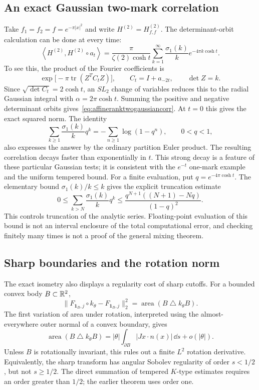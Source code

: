 \subsection{An exact Gaussian two-mark correlation}
\label{subsec:affineranktwogaussian}

Take $f_1=f_2=f=e^{-\pi|x|^2}$ and write $H^{(2)}=H_{f,f}^{(2)}$.
The determinant-orbit calculation can be done at every time:
\begin{equation}
 \boxed{
 \left\langle H^{(2)},H^{(2)}\circ a_t\right\rangle
 =\frac{\pi}{\zeta(2)\cosh t}
       \sum_{k=1}^\infty\frac{\sigma_1(k)}k
                         e^{-4\pi k\cosh t}.
 }
 \label{eq:affineranktwogaussiancorr}
\end{equation}
To see this, the product of the Fourier coefficients is
\[
 \exp\bigl[-\pi\operatorname{tr}(Z^TC_tZ)\bigr],
 \qquad C_t=I+a_{-2t},\qquad \det Z=k.
\]
Since $\sqrt{\det C_t}=2\cosh t$, an $SL_2$ change of variables
reduces this to the radial Gaussian integral with
$\alpha=2\pi\cosh t$. Summing the positive and negative determinant
orbits gives~\eqref{eq:affineranktwogaussiancorr}. At $t=0$ this gives
the exact squared norm. The identity
\[
 \sum_{k\geq1}\frac{\sigma_1(k)}k q^k
 =-\sum_{n\geq1}\log(1-q^n),\qquad 0<q<1,
\]
also expresses the answer by the ordinary partition Euler product.
The resulting correlation decays faster than exponentially in $t$.
This strong decay is a feature of these particular Gaussian tests;
it is consistent with the $e^{-t}$ one-mark example and the uniform
tempered bound.
For a finite evaluation, put $q=e^{-4\pi\cosh t}$. The elementary bound
$\sigma_1(k)/k\leq k$ gives the explicit truncation estimate
\[
 0\leq\sum_{k>N}\frac{\sigma_1(k)}kq^k
 \leq\frac{q^{N+1}((N+1)-Nq)}{(1-q)^2}.
\]
This controls truncation of the analytic series. Floating-point
evaluation of this bound is not an interval enclosure of the total
computational error, and checking finitely many times is not a proof
of the general mixing theorem.

\subsection{Sharp boundaries and the rotation norm}
\label{subsec:affinesharprotation}

The exact isometry also displays a regularity cost of sharp cutoffs.
For a bounded convex body $B\subset\mathbb R^2$,
\[
 \|F_{\mathbf1_B,j}\circ k_\theta-F_{\mathbf1_B,j}\|_2^2
 =\operatorname{area}(B\mathbin\triangle k_\theta B).
\]
The first variation of area under rotation, interpreted using the
almost-everywhere outer normal of a convex boundary, gives
\[
 \operatorname{area}(B\mathbin\triangle k_\theta B)
 =|\theta|\int_{\partial B}|Jx\cdot n(x)|\,\dd s+o(|\theta|).
\]
Unless $B$ is rotationally invariant, this rules out a finite
$L^2$ rotation derivative. Equivalently, the sharp transform has
angular Sobolev regularity of order $s<1/2$, but not $s\geq1/2$.
The direct summation of tempered $K$-type estimates requires an
order greater than $1/2$; the earlier theorem uses order one.

